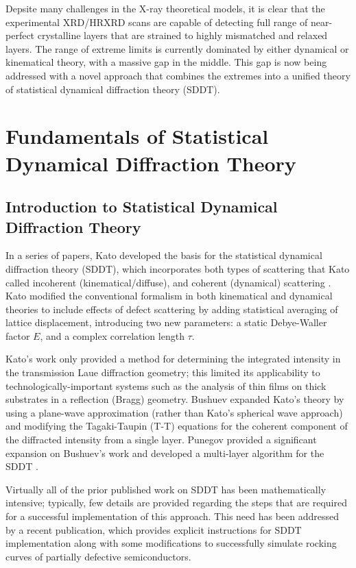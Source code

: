 Depsite many challenges in the X-ray theoretical models, it is clear that the experimental XRD/HRXRD scans are capable of detecting full range of near-perfect crystalline layers that are strained to highly mismatched and relaxed layers.  The range of extreme limits is currently dominated by either dynamical or kinematical theory, with a massive gap in the middle.  This gap is now being addressed with a novel approach that combines the extremes into a unified theory of statistical dynamical diffraction theory (SDDT).


\chapter{Fundamentals of Statistical Dynamical Diffraction Theory}

	\section{Introduction to Statistical Dynamical Diffraction Theory}

In a series of papers, Kato developed the basis for the statistical dynamical diffraction theory (SDDT), which incorporates both types of scattering that Kato called incoherent (kinematical/diffuse), and coherent (dynamical) scattering \cite{KatoI,KatoII,KatoIII,KatoIV,Kato2,Kato1}. Kato modified the conventional formalism in both kinematical and dynamical theories to include effects of defect scattering by adding statistical averaging of lattice displacement, introducing two new parameters: a static Debye-Waller factor $E$, and a complex correlation length $\tau$.  

Kato's work only provided a method for determining the integrated intensity in the transmission Laue diffraction geometry; this limited its applicability to technologically-important systems such as the analysis of thin films on thick substrates in a reflection (Bragg) geometry.  Bushuev \cite{Bushuev1,Bushuev2} expanded Kato's theory by using a plane-wave approximation (rather than Kato's spherical wave approach) and modifying the Tagaki-Taupin (T-T) equations \cite{Takagi1,Taupin1,Takagi2} for the coherent component of the diffracted intensity from a single layer. Punegov provided a significant expansion on Bushuev's work \cite{Punegov1,Punegov12,Punegov13,Punegov2,Punegov9} and developed a multi-layer algorithm for the SDDT \cite{Punegov15}.  

Virtually all of the prior published work on SDDT has been mathematically intensive; typically, few details are provided regarding the steps that are required for a successful implementation of this approach.  This need has been addressed by a recent publication\cite{Shreeman1}, which provides explicit instructions for SDDT implementation along with some modifications to successfully simulate rocking curves of partially defective semiconductors.  


